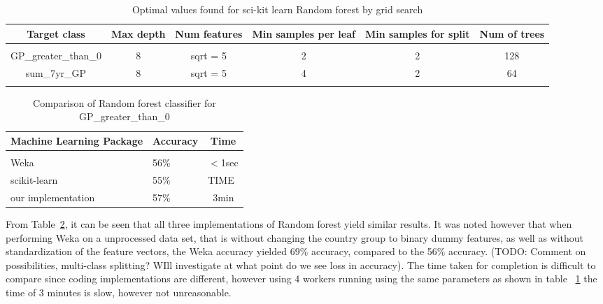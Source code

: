 \documentclass{article} %
\begin{document}
\begin{table}[t]
\caption{Optimal values found for sci-kit learn Random forest by grid search}
\begin{center}
\begin{tabular}{cccccc}
{\bf Target class} &{\bf Max depth} &{\bf Num features} &{\bf Min samples per leaf} &{\bf Min samples for split} &{\bf Num of trees}
\\ \hline \\
GP\_greater\_than\_0         &8	&sqrt = 5	&2	&2	&128 \\
sum\_7yr\_GP         &8	&sqrt = 5	&4	&2	&64 \\
\label{scikit-table}
\end{tabular}
\end{center}
\end{table}


\begin{table}[t]
\caption{Comparison of Random forest classifier for GP\_greater\_than\_0}
\label{clas-table}
\begin{center}
\begin{tabular}{lll}
\multicolumn{1}{c}{\bf Machine Learning Package} &\multicolumn{1}{c}{\bf Accuracy} &\multicolumn{1}{c}{\bf Time}
\\ \hline \\
Weka         &56\%	&$<$1sec \\
scikit-learn             &55\%	&TIME \\
our implementation             &57\%	&~3min \\

\end{tabular}
\end{center}
\end{table}

From Table~\ref{clas-table}, it can be seen that all three implementations of Random forest yield similar results. It was noted however that when performing Weka on a unprocessed data set, that is without changing the country group to binary dummy features, as well as without standardization of the feature vectors, the Weka accuracy yielded 69\% accuracy, compared to the 56\% accuracy. (TODO: Comment on possibilities, multi-class splitting? WIll investigate at what point do we see loss in accuracy). The time taken for completion is difficult to compare since coding implementations are different, however using 4 workers running using the same parameters as shown in table ~\ref{scikit-table} the time of 3 minutes is slow, however not unreasonable. 
\end{document}
